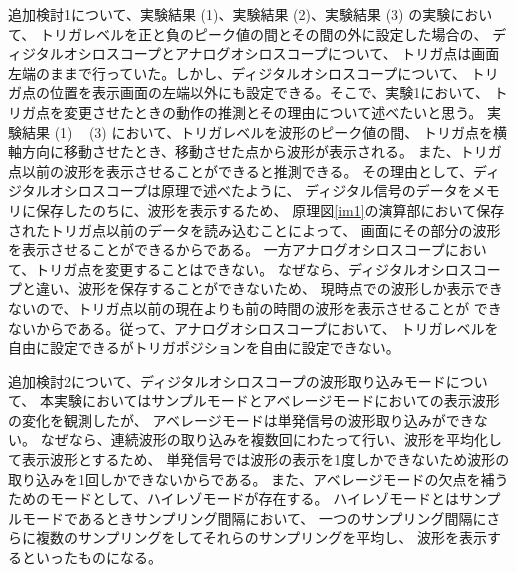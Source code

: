 追加検討1について、実験結果 (1)、実験結果 (2)、実験結果 (3) の実験において、
トリガレベルを正と負のピーク値の間とその間の外に設定した場合の、
ディジタルオシロスコープとアナログオシロスコープについて、
トリガ点は画面左端のままで行っていた。しかし、ディジタルオシロスコープについて、
トリガ点の位置を表示画面の左端以外にも設定できる。そこで、実験1において、
トリガ点を変更させたときの動作の推測とその理由について述べたいと思う。
実験結果 (1) ~ (3) において、トリガレベルを波形のピーク値の間、
トリガ点を横軸方向に移動させたとき、移動させた点から波形が表示される。
また、トリガ点以前の波形を表示させることができると推測できる。
その理由として、ディジタルオシロスコープは原理で述べたように、
ディジタル信号のデータをメモリに保存したのちに、波形を表示するため、
原理図\ref{im1}の演算部において保存されたトリガ点以前のデータを読み込むことによって、
画面にその部分の波形を表示させることができるからである。
一方アナログオシロスコープにおいて、トリガ点を変更することはできない。
なぜなら、ディジタルオシロスコープと違い、波形を保存することができないため、
現時点での波形しか表示できないので、トリガ点以前の現在よりも前の時間の波形を表示させることが
できないからである。従って、アナログオシロスコープにおいて、
トリガレベルを自由に設定できるがトリガポジションを自由に設定できない。
\par
追加検討2について、ディジタルオシロスコープの波形取り込みモードについて、
本実験においてはサンプルモードとアベレージモードにおいての表示波形の変化を観測したが、
アベレージモードは単発信号の波形取り込みができない。
なぜなら、連続波形の取り込みを複数回にわたって行い、波形を平均化して表示波形とするため、
単発信号では波形の表示を1度しかできないため波形の取り込みを1回しかできないからである。
また、アベレージモードの欠点を補うためのモードとして、ハイレゾモードが存在する。
ハイレゾモードとはサンプルモードであるときサンプリング間隔において、
一つのサンプリング間隔にさらに複数のサンプリングをしてそれらのサンプリングを平均し、
波形を表示するといったものになる。

